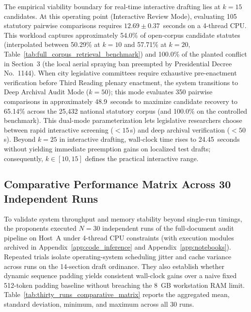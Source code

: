 The empirical viability boundary for real-time interactive drafting lies at $k = 15$ candidates. At this operating point (Interactive Review Mode), evaluating 105 statutory pairwise comparisons requires $12.69 \pm 0.37$~seconds on a 4-thread CPU. This workload captures approximately 54.0\% of open-corpus candidate statutes (interpolated between 50.29\% at $k=10$ and 57.71\% at $k=20$, Table~\ref{tab:full_corpus_retrieval_benchmark}) and 100.0\% of the planted conflict in Section~3 (the local aerial spraying ban preempted by Presidential Decree No.~1144). When city legislative committees require exhaustive pre-enactment verification before Third Reading plenary enactment, the system transitions to Deep Archival Audit Mode ($k=50$); this mode evaluates 350 pairwise comparisons in approximately 48.9~seconds to maximize candidate recovery to 65.14\% across the 25,432 national statutory corpus (and 100.0\% on the controlled benchmark). This dual-mode parameterization lets legislative researchers choose between rapid interactive screening ($<15$\,s) and deep archival verification ($<50$\,s). Beyond $k = 25$ in interactive drafting, wall-clock time rises to 24.45~seconds without yielding immediate preemption gains on localized test drafts; consequently, $k \in [10, 15]$ defines the practical interactive range.


\subsection{Comparative Performance Matrix Across 30 Independent Runs}
\label{sec:thirty_runs_matrix}

To validate system throughput and memory stability beyond single-run timings, the proponents executed $N = 30$ independent runs of the full-document audit pipeline on Host~A under 4-thread CPU constraints (with execution modules archived in Appendix~\ref{app:code_inference} and Appendix~\ref{app:notebooks}). Repeated trials isolate operating-system scheduling jitter and cache variance across runs on the 14-section draft ordinance. They also establish whether dynamic sequence padding yields consistent wall-clock gains over a naive fixed 512-token padding baseline without breaching the 8~GB workstation RAM limit. Table~\ref{tab:thirty_runs_comparative_matrix} reports the aggregated mean, standard deviation, minimum, and maximum across all 30 runs.

